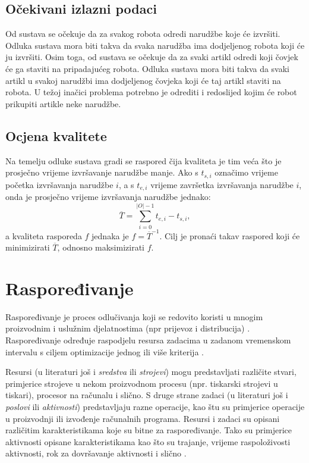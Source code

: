\documentclass[times, utf8, seminar]{fer}
\begin{document}
\section{Očekivani izlazni podaci}
Od sustava se očekuje da za svakog robota odredi narudžbe koje će izvršiti. Odluka sustava mora biti
takva da svaka narudžba ima dodjeljenog robota koji će ju izvršiti. Osim toga, od sustava se očekuje
da za svaki artikl odredi koji čovjek će ga staviti na pripadajućeg robota. Odluka sustava mora biti
takva da svaki artikl u svakoj narudžbi ima dodjeljenog čovjeka koji će taj artikl staviti na robota.
U težoj inačici problema potrebno je odrediti i redoslijed kojim
će robot prikupiti artikle neke narudžbe.

\section{Ocjena kvalitete}
Na temelju odluke sustava gradi se raspored čija kvaliteta  je tim
veća što je prosječno vrijeme izvršavanje narudžbe manje. Ako s
$t_{s, i}$ označimo vrijeme početka izvršavanja narudžbe $i$, a s $t_{e, i}$
vrijeme završetka izvršavanja narudžbe $i$, onda je prosječno vrijeme izvršavanja
narudžbe jednako:
\begin{equation}
    \overline{T} = \sum_{i = 0}^{|O| - 1}{t_{e, i} - t_{s, i}},
\end{equation}
a kvaliteta rasporeda $f$ jednaka je $f = \overline{T}^{-1}$. Cilj je
pronaći takav raspored koji će minimizirati $\overline{T}$, odnosno
maksimizirati $f$.

\chapter{Raspoređivanje}
Raspoređivanje je proces odlučivanja koji se redovito koristi u
mnogim proizvodnim i uslužnim djelatnostima (npr prijevoz i distribucija) \citep{michael2018scheduling}.
Raspoređivanje određuje raspodjelu resursa zadacima u zadanom vremenskom
intervalu s ciljem optimizacije jednog ili više kriterija \citep{michael2018scheduling}.

Resursi (u literaturi još i \emph{sredstva} ili \emph{strojevi}) mogu predstavljati različite stvari, primjerice strojeve
u nekom proizvodnom procesu (npr. tiskarski strojevi u tiskari), procesor na računalu
i slično. S druge strane zadaci (u literaturi još i \emph{poslovi} ili \emph{aktivnosti}) predstavljaju
razne operacije, kao štu su primjerice operacije u proizvodnji ili izvođenje računalnih programa.
Resursi i zadaci su opisani različitim karakteristikama koje su bitne za raspoređivanje.
Tako su primjerice aktivnosti opisane karakteristikama kao što su trajanje, vrijeme raspoloživosti
aktivnosti, rok za dovršavanje aktivnosti i slično \citep{Durasevic}.
\end{document}
